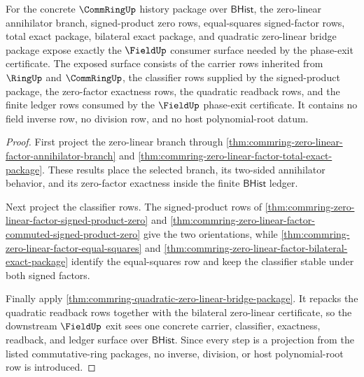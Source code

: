 \begin{theorem}
\label{thm:commring-zero-linear-field-exit-consumer-surface}
For the concrete $\CommRingUp$ history package over $\mathsf{BHist}$, the
zero-linear annihilator branch, signed-product zero rows, equal-squares
signed-factor rows, total exact package, bilateral exact package, and
quadratic zero-linear bridge package expose exactly the $\FieldUp$ consumer
surface needed by the phase-exit certificate. The exposed surface consists of
the carrier rows inherited from $\RingUp$ and $\CommRingUp$, the classifier
rows supplied by the signed-product package, the zero-factor exactness rows,
the quadratic readback rows, and the finite ledger rows consumed by the
$\FieldUp$ phase-exit certificate. It contains no field inverse row, no
division row, and no host polynomial-root datum.
\end{theorem}
\begin{proof}
First project the zero-linear branch through
\autoref{thm:commring-zero-linear-factor-annihilator-branch} and
\autoref{thm:commring-zero-linear-factor-total-exact-package}. These results
place the selected branch, its two-sided annihilator behavior, and its
zero-factor exactness inside the finite $\mathsf{BHist}$ ledger.

Next project the classifier rows. The signed-product rows of
\autoref{thm:commring-zero-linear-factor-signed-product-zero} and
\autoref{thm:commring-zero-linear-factor-commuted-signed-product-zero} give
the two orientations, while
\autoref{thm:commring-zero-linear-factor-equal-squares} and
\autoref{thm:commring-zero-linear-factor-bilateral-exact-package} identify
the equal-squares row and keep the classifier stable under both signed
factors.

Finally apply
\autoref{thm:commring-quadratic-zero-linear-bridge-package}. It repacks the
quadratic readback rows together with the bilateral zero-linear certificate,
so the downstream $\FieldUp$ exit sees one concrete carrier, classifier,
exactness, readback, and ledger surface over $\mathsf{BHist}$. Since every
step is a projection from the listed commutative-ring packages, no inverse,
division, or host polynomial-root row is introduced.
\end{proof}




